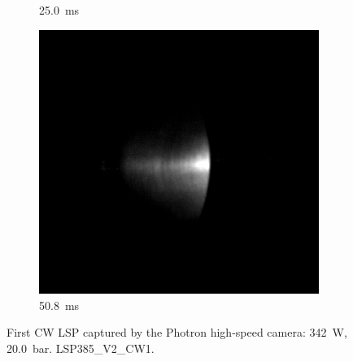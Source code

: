\begin{figure}[!ht]
\begin{subfigure}[t]{0.3\textwidth}
        \caption{\qty{25.0}{ms}}
    \end{subfigure}
    \hfill
    \begin{subfigure}[t]{0.3\textwidth}
        \centering
        \includegraphics[width=\textwidth]{assets/4 experiments/CW LSP frames Photron/LSP385_V2_CW1_Fr508.png}
        \caption{\qty{50.8}{ms}}
    \end{subfigure}
    \caption{First CW LSP captured by the Photron high-speed camera: \qty{342}{W}, \qty{20.0}{bar}. LSP385\_V2\_CW1.}
    \label{fig:CW_V2_Photron_frames}
\end{figure}

